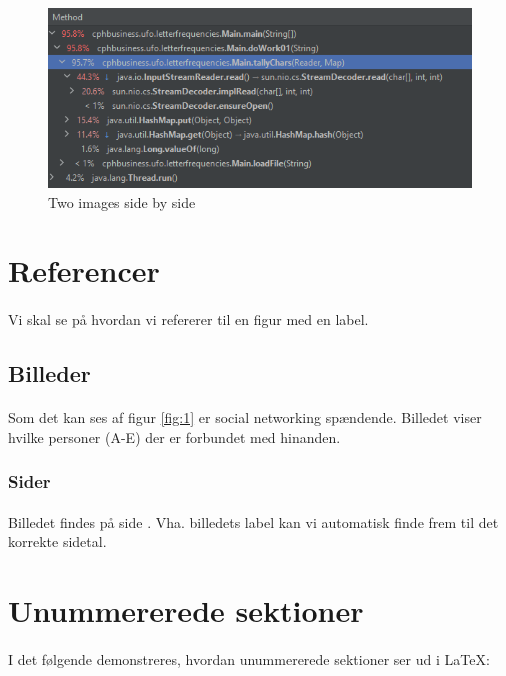 \documentclass{article}
\begin{document}
\begin{enumerate}
\begin{figure}[htb!]
\begin{minipage}[t]{.5\textwidth}
        \end{minipage}
        \begin{minipage}[t]{.5\textwidth}
            \centering
            \includegraphics[scale=.5]{images/profiler1.png}            
        \end{minipage}
        \caption{Two images side by side}
    \end{figure}
\newpage
\section{Referencer}
\paragraph{}
Vi skal se på hvordan vi refererer til en figur med en label.
    \subsection{Billeder}        
    \paragraph{}
        Som det kan ses af figur \ref{fig:1} er social networking spændende. Billedet viser hvilke personer (A-E) der er forbundet med hinanden.
        \subsubsection{Sider}
        \paragraph{}
        Billedet findes på side \pageref{fig:1}. Vha. billedets label kan vi automatisk finde frem til det korrekte sidetal.
\section{Unummererede sektioner}
\paragraph{}
I det følgende demonstreres, hvordan unummererede sektioner ser ud i \LaTeX:

\end{enumerate}
\end{document}
